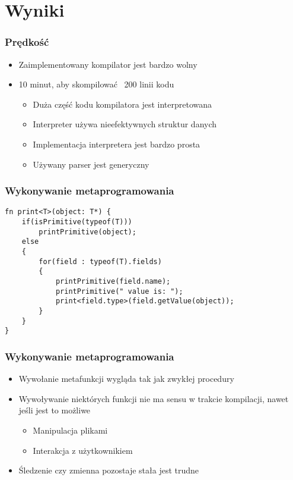 \section{Wyniki}

\begin{frame}
	\frametitle{Prędkość}

	\begin{itemize}
		\item Zaimplementowany kompilator jest bardzo wolny
		\item 10 minut, aby skompilować ~200 linii kodu\begin{itemize}
			\item Duża część kodu kompilatora jest interpretowana
			\item Interpreter używa nieefektywnych struktur danych
			\item Implementacja interpretera jest bardzo prosta
			\item Używany parser jest generyczny
		\end{itemize}
	\end{itemize}

\end{frame}

\begin{frame}[fragile]
	\frametitle{Wykonywanie metaprogramowania}

	\begin{lstlisting}
fn print<T>(object: T*) {
	if(isPrimitive(typeof(T)))
		printPrimitive(object);
	else
	{
		for(field : typeof(T).fields)
		{
			printPrimitive(field.name);
			printPrimitive(" value is: ");
			print<field.type>(field.getValue(object));
		}
	}
}
	\end{lstlisting}

\end{frame}

\begin{frame}
	\frametitle{Wykonywanie metaprogramowania}

\begin{itemize}
	\item Wywołanie metafunkcji wygląda tak jak zwykłej procedury
	\item Wywoływanie niektórych funkcji nie ma sensu w trakcie kompilacji, nawet jeśli jest to możliwe\begin{itemize}
		\item Manipulacja plikami
		\item Interakcja z użytkownikiem
	\end{itemize}
	\item Śledzenie czy zmienna pozostaje stała jest trudne
\end{itemize}

\end{frame}

